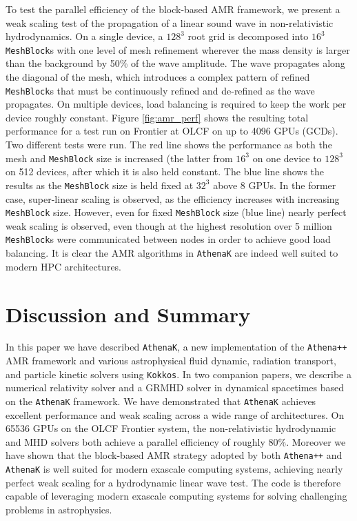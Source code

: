 \documentclass[twocolumn, floatfix]{aastex63}
\newcommand{\app}{\texttt{Athena++}}
\newcommand{\ak}{\texttt{AthenaK}}
\newcommand{\kokkos}{\texttt{Kokkos}}
\begin{document}
To test the parallel efficiency of the block-based AMR framework, we present a weak scaling test of the propagation of a linear sound wave in non-relativistic hydrodynamics.  On a single device, a $128^3$ root grid is decomposed into $16^3$ {\tt MeshBlock}s with one level of mesh refinement wherever the mass density is larger than the background by 50\% of the wave amplitude.  The wave propagates along the diagonal of the mesh, which introduces a complex pattern of refined {\tt MeshBlock}s that must be continuously refined and de-refined as the wave propagates.  On multiple devices, load balancing is required to keep the work per device roughly constant.  Figure \ref{fig:amr_perf} shows the resulting total performance for a test run on Frontier at OLCF on up to 4096 GPUs (GCDs). Two different tests were run.  The red line shows the performance as both the mesh and {\tt MeshBlock} size is increased (the latter from $16^3$ on one device to $128^3$ on 512 devices, after which it is also held constant.  The blue line shows the results as the {\tt MeshBlock} size is held fixed at $32^3$ above 8 GPUs.  In the former case, super-linear scaling is observed, as the efficiency increases with increasing {\tt MeshBlock} size.  However, even for fixed {\tt MeshBlock} size (blue line) nearly perfect weak scaling is observed, even though at the highest resolution over 5 million {\tt MeshBlock}s were communicated between nodes in order to achieve good load balancing.  It is clear the AMR algorithms in \ak{} are indeed well suited to modern HPC architectures.

\section{Discussion and Summary}

In this paper we have described \ak{}, a new implementation of the \app{} AMR framework and various astrophysical fluid dynamic, radiation transport, and particle kinetic solvers using \kokkos{}. In two companion papers, we describe a numerical relativity solver \citep{Zhu.9.24} and a GRMHD solver in dynamical spacetimes \citep{Fields.9.24} based on the \ak{} framework. We have demonstrated that \ak{} achieves excellent performance and weak scaling across a wide range of architectures.  On 65536 GPUs on the OLCF Frontier system, the non-relativistic hydrodynamic and MHD solvers both achieve a parallel efficiency of roughly 80\%.  Moreover we have shown that the block-based AMR strategy adopted by both \app{} and \ak{} is well suited for modern exascale computing systems, achieving nearly perfect weak scaling for a hydrodynamic linear wave test. The code is therefore capable of leveraging modern exascale computing systems for solving challenging problems in astrophysics.
\end{document}
